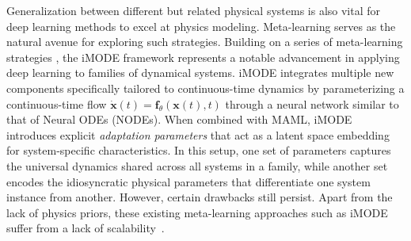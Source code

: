 Generalization between different but related physical systems is also vital for deep learning methods to excel at physics modeling. Meta-learning serves as the natural avenue for exploring such strategies. Building on a series of meta-learning strategies \cite{finn2017modelagnosticmetalearningfastadaptation,rajeswaran2019meta,zintgraf2019fast,nichol2018first}, the iMODE framework represents a notable advancement in applying deep learning to families of dynamical systems. iMODE integrates multiple new components specifically tailored to continuous-time dynamics by parameterizing a continuous-time flow 
 $\dot{\mathbf x}(t) = \mathbf f_\theta(\mathbf{\mathbf x}(t), t)$ through a neural network similar to that of Neural ODEs (NODEs). When combined with MAML, iMODE introduces explicit \emph{adaptation parameters} that act as a latent space embedding for system-specific characteristics. In this setup, one set of parameters captures the universal dynamics shared across all systems in a family, while another set encodes the idiosyncratic physical parameters that differentiate one system instance from another. However, certain drawbacks still persist. Apart from the lack of physics priors, these existing meta-learning approaches such as iMODE suffer from a lack of scalability~\cite{choe2023makingscalablemetalearning}.  

